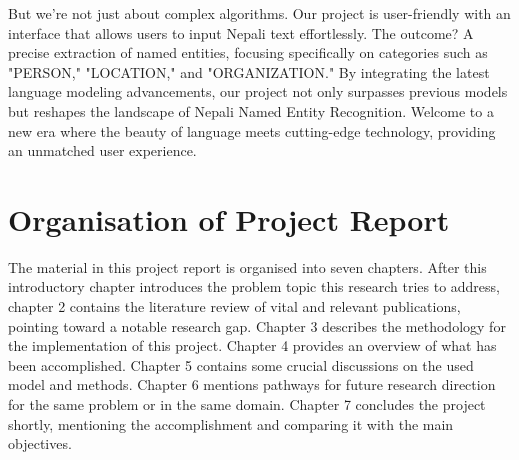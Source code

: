 But we're not just about complex algorithms. Our project is user-friendly with an interface that allows users to input Nepali text effortlessly. The outcome? A precise extraction of named entities, focusing specifically on categories such as "PERSON," "LOCATION," and "ORGANIZATION." By integrating the latest language modeling advancements, our project not only surpasses previous models but reshapes the landscape of Nepali Named Entity Recognition. Welcome to a new era where the beauty of language meets cutting-edge technology, providing an unmatched user experience.

\newpage
\section{Organisation of Project Report}

The material in this project report is organised into seven chapters. After this introductory chapter introduces the problem topic this research tries to address, chapter 2 contains the literature review of vital and relevant publications, pointing toward a notable research gap. Chapter 3 describes the methodology for the implementation of this project. Chapter 4 provides an overview of what has been accomplished. Chapter 5 contains some crucial discussions on the used model and methods. Chapter 6 mentions pathways for future research direction for the same problem or in the same domain. Chapter 7 concludes the project shortly, mentioning the accomplishment and comparing it with the main objectives.